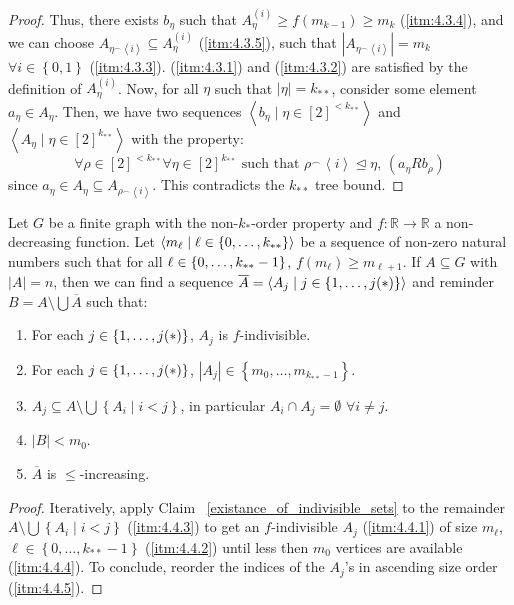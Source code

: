 \begin{proof}
            Thus, there exists $b_\eta$ such that $A_\eta^{(i)} \geq f(m_{k-1}) \geq m_{k}$ (\ref{itm:4.3.4}), and we can choose
            $A_{\eta^\frown \left< i \right>} \subseteq A_\eta^{(i)}$ (\ref{itm:4.3.5}), such that
            $|A_{\eta^\frown \left< i \right>}| = m_{k}$ $\forall i \in \left\{ 0,1 \right\}$ (\ref{itm:4.3.3}).
            (\ref{itm:4.3.1}) and (\ref{itm:4.3.2}) are satisfied by the definition of $A_\eta^{(i)}$.
            Now, for all $\eta$ such that $|\eta| = k_{**}$, consider some element $a_\eta \in A_\eta$.
            Then, we have two sequences $\left< b_\eta \mid \eta \in [2]^{<k_{**}} \right>$ and $\left< A_\eta \mid \eta \in [2]^{k_{**}} \right>$
            with the property:
            \[
                \forall \rho \in [2]^{<k_{**}} \forall \eta \in [2]^{k_{**}} \text{ such that } \rho^\frown \left< i \right> \trianglelefteq
                    \eta \text{, } (a_\eta R b_\rho)
            \]
            since $a_\eta \in A_\eta \subseteq A_{\rho ^\frown \left< i \right>}$.
            This contradicts the $k_{**}$ tree bound.
        \end{proof}

    \lemma[Claim 4.4 + 4.5]\label{existance_of_ordered_f_indivisible_partitions}
        Let $G$ be a finite graph with the non-$k_{*}$-order property and $f: \mathbb{R} \longrightarrow \mathbb{R}$ a non-decreasing function.
        Let $\left< m_\ell \mid \ell \in \left\{ 0, \dots, k_{**} \right\} \right>$ be a sequence of non-zero natural numbers such that
        for all $\ell \in \left\{ 0, \dots, k_{**}-1 \right\}$, $f(m_{\ell}) \geq m_{\ell+1}$.
        If $A \subseteq G$ with $|A| = n$, then we can find a sequence $\overline{A} = \left< A_j \mid j \in \left\{ 1, \dots, j(*) \right\} \right>$
        and reminder $B = A \setminus \bigcup \overline{A}$ such that:
        \begin{enumerate}
            \item \label{itm:4.4.1} For each $j \in \left\{ 1, \dots, j(*) \right\}$, $A_j$ is $f$-indivisible.
            \item \label{itm:4.4.2} For each $j \in \left\{ 1, \dots, j(*) \right\}$, $|A_j| \in \left\{ m_0, \dots, m_{k_{**}-1} \right\}$.
            \item \label{itm:4.4.3} $A_j \subseteq A \setminus \bigcup\left\{ A_i \mid i < j \right\}$, in particular $A_i \cap A_j = \emptyset$ $\forall i \neq j$.
            \item \label{itm:4.4.4} $|B| < m_0$.
            \item \label{itm:4.4.5} $\overline{A}$ is $\leq$-increasing.
        \end{enumerate}
        \begin{proof}
            Iteratively, apply Claim ~\ref{existance_of_indivisible_sets} to the remainder $A \setminus \bigcup \left\{ A_i \mid i < j \right\}$
            (\ref{itm:4.4.3}) to get an $f$-indivisible $A_j$ (\ref{itm:4.4.1}) of size $m_\ell$, $\ell \in \left\{ 0, \dots, k_{**}-1 \right\}$
            (\ref{itm:4.4.2}) until less then $m_0$ vertices are available (\ref{itm:4.4.4}).
            To conclude, reorder the indices of the $A_j$'s in ascending size order (\ref{itm:4.4.5}).
        \end{proof}

